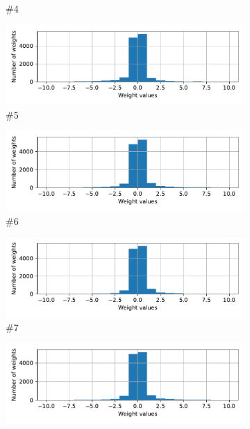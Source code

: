 \documentclass{article}
\begin{document}
\begin{figure}
\begin{subfigure}{0.48\linewidth}
        \caption{ \#4}
    \end{subfigure}
    \begin{subfigure}{0.48\linewidth}
        \centering
        \includegraphics[width=\linewidth]{hist_layer5}
        \caption{ \#5}
    \end{subfigure}
    \hfill
    \begin{subfigure}{0.48\linewidth}
        \centering
        \includegraphics[width=\linewidth]{hist_layer6}
        \caption{ \#6}
    \end{subfigure}
    \begin{subfigure}{0.48\linewidth}
        \centering
        \includegraphics[width=\linewidth]{hist_layer7}
        \caption{ \#7}
    \end{subfigure}
    \hfill
    \begin{subfigure}{0.48\linewidth}
        \centering
        \includegraphics[width=\linewidth]{hist_layer8}

\end{subfigure}
\end{figure}
\end{document}
